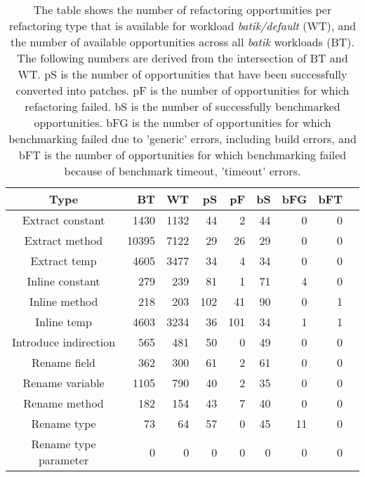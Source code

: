\begin{table}[!h]
\caption{The table shows the number of refactoring opportunities per refactoring type that is available for workload \textit{batik/default} (WT), and the number of available opportunities across all \textit{batik} workloads (BT). The following numbers are derived from the intersection of BT and WT. pS is the number of opportunities that have been successfully converted into patches. pF is the number of opportunities for which refactoring failed. bS is the number of successfully benchmarked opportunities. bFG is the number of opportunities for which benchmarking failed due to 'generic' errors, including build errors, and bFT is the number of opportunities for which benchmarking failed because of benchmark timeout, 'timeout' errors.}
\begin{tabular}{c|*{7}{r}r}
Type&BT&WT&pS&pF&bS&bFG&bFT\\
\hline
Extract constant&1430&1132&44&2&44&0&0\\
Extract method&10395&7122&29&26&29&0&0\\
Extract temp&4605&3477&34&4&34&0&0\\
Inline constant&279&239&81&1&71&4&0\\
Inline method&218&203&102&41&90&0&1\\
Inline temp&4603&3234&36&101&34&1&1\\
Introduce indirection&565&481&50&0&49&0&0\\
Rename field&362&300&61&2&61&0&0\\
Rename variable&1105&790&40&2&35&0&0\\
Rename method&182&154&43&7&40&0&0\\
Rename type&73&64&57&0&45&11&0\\
Rename type parameter&0&0&0&0&0&0&0\\
\end{tabular}
\end{table}
